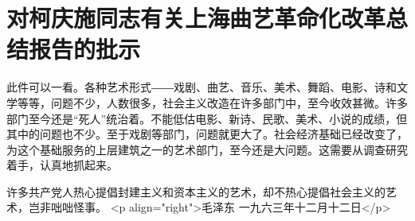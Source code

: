 \section[对柯庆施同志有关上海曲艺革命化改革总结报告的批示（一九六三年十二月十二日）]{对柯庆施同志有关上海曲艺革命化改革总结报告的批示}


此件可以一看。各种艺术形式――戏剧、曲艺、音乐、美术、舞蹈、电影、诗和文学等等，问题不少，人数很多，社会主义改造在许多部门中，至今收效甚微。许多部门至今还是“死人”统治着。不能低估电影、新诗、民歌、美术、小说的成绩，但其中的问题也不少。至于戏剧等部门，问题就更大了。社会经济基础已经改变了，为这个基础服务的上层建筑之一的艺术部门，至今还是大问题。这需要从调查研究着手，认真地抓起来。

许多共产党人热心提倡封建主义和资本主义的艺术，却不热心提倡社会主义的艺术，岂非咄咄怪事。
<p align="right">毛泽东
一九六三年十二月十二日</p>


